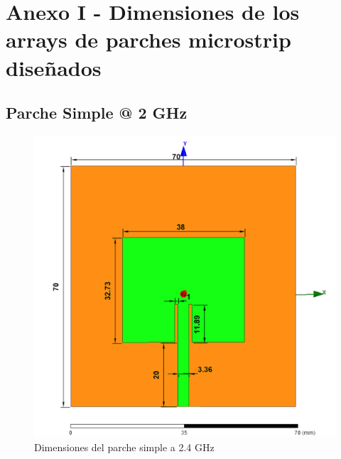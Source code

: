 
\chapter{Anexo I - Dimensiones de los arrays de parches microstrip diseñados}

\section{Parche Simple @ 2 GHz}
\vfill
\begin{figure}[H]
   	 \centering
        \includegraphics[width=\textwidth ,height=\textheight, keepaspectratio=true]{archivos/desarrollo/autocad/1}
        \caption{Dimensiones del parche simple a 2.4 GHz}
        \label{fig:simple1}
\end{figure}
\vfill
\newpage


